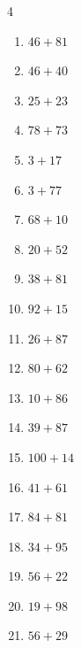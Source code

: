 \begin{multicols}{4}
\begin{enumerate}
  \item $46+81$
        \phantom{$=127$}

  \item $46+40$
        \phantom{$=86$}

  \item $25+23$
        \phantom{$=48$}

  \item $78+73$
        \phantom{$=151$}

  \item $3+17$
        \phantom{$=20$}

  \item $3+77$
        \phantom{$=80$}

  \item $68+10$
        \phantom{$=78$}

  \item $20+52$
        \phantom{$=72$}

\columnbreak %

\resetques

  \item $38+81$
        \phantom{$=119$}

  \item $92+15$
        \phantom{$=107$}

  \item $26+87$
        \phantom{$=113$}

  \item $80+62$
        \phantom{$=142$}

  \item $10+86$
        \phantom{$=96$}

  \item $39+87$
        \phantom{$=126$}

  \item $100+14$
        \phantom{$=114$}

  \item $41+61$
        \phantom{$=102$}

  \item $84+81$
        \phantom{$=165$}

  \item $34+95$
        \phantom{$=129$}

  \item $56+22$
        \phantom{$=78$}

  \item $19+98$
        \phantom{$=117$}

  \item $56+29$
        \phantom{$=85$}


\end{enumerate}
\end{multicols}
